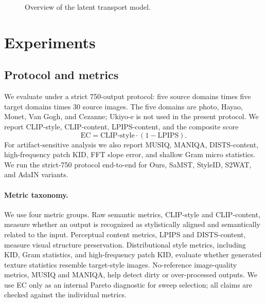 ﻿\documentclass[letterpaper]{article}
\begin{document}
\begin{figure}[t]
    \centering
    \vspace{-0.5cm}
    \resizebox{0.88\columnwidth}{!}{}
    \caption{Overview of the latent transport model.}
    \label{fig:framework}
\end{figure}

\section{Experiments}
\subsection{Protocol and metrics}
We evaluate under a strict 750-output protocol: five source domains times five target domains times 30 source images. The five domains are photo, Hayao, Monet, Van Gogh, and Cezanne; Ukiyo-e is not used in the present protocol. We report CLIP-style, CLIP-content, LPIPS-content, and the composite score
\begin{equation}
    \mathrm{EC} = \mathrm{CLIP\mbox{-}style}\cdot(1-\mathrm{LPIPS}).
\end{equation}
For artifact-sensitive analysis we also report MUSIQ, MANIQA, DISTS-content, high-frequency patch KID, FFT slope error, and shallow Gram micro statistics. We run the strict-750 protocol end-to-end for Ours, SaMST, StyleID, S2WAT, and AdaIN variants.

\paragraph{Metric taxonomy.}
We use four metric groups. Raw semantic metrics, CLIP-style and CLIP-content, measure whether an output is recognized as stylistically aligned and semantically related to the input. Perceptual content metrics, LPIPS and DISTS-content, measure visual structure preservation. Distributional style metrics, including KID, Gram statistics, and high-frequency patch KID, evaluate whether generated texture statistics resemble target-style images. No-reference image-quality metrics, MUSIQ and MANIQA, help detect dirty or over-processed outputs. We use EC only as an internal Pareto diagnostic for sweep selection; all claims are checked against the individual metrics.
\end{document}
